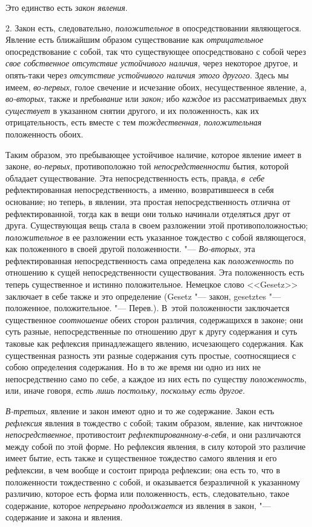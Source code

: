 Это единство есть {\em закон явления}.

2. Закон есть, следовательно, {\em положительное} в
опосредствовании являющегося. Явление есть ближайшим образом существование
как {\em отрицательное} опосредствование с собой, так
что существующее опосредствовано с собой через
{\em свое собственное отсутствие устойчивого наличия},
через некоторое другое, и опять-таки через
{\em отсутствие устойчивого наличия этого другого}.
Здесь мы имеем, {\em во-первых}, голое свечение и
исчезание обоих, несущественное явление, а,
{\em во-вторых}, также и {\em пребывание} или {\em закон;}
ибо {\em каждое} из рассматриваемых двух
{\em существует} в указанном снятии другого, и их
положенность, как их отрицательность, есть вместе с тем
{\em тождественная, положительная} положенность обоих.

Таким образом, это пребывающее устойчивое наличие, которое явление имеет в
законе, {\em во-первых}, противоположно той
{\em непосредственности} бытия, которой обладает
существование. Эта непосредственность есть, правда,
{\em в~себе} рефлектированная непосредственность, а
именно, возвратившееся в себя основание; но теперь, в явлении, эта простая
непосредственность отлична от рефлектированной, тогда как в вещи они только
начинали отделяться друг от друга. Существующая вещь стала в своем
разложении этой противоположностью; {\em положительное}
в ее разложении есть указанное тождество с собой являющегося, как
положенного в своей другой положенности. "---
{\em Во-вторых}, эта рефлектированная непосредственность сама определена как
{\em положенность} по отношению к сущей
непосредственности существования. Эта положенность есть теперь существенное
и истинно положительное. Немецкое слово <<Gesetz>> заключает в себе также и
это определение (Gesetz "--- закон, gesetztes "--- положенное,
положительное. "--- Перев.). В~этой положенности заключается существенное
{\em соотношение} обеих сторон различия, содержащихся в
законе; они суть разные, непосредственные по отношению друг к другу
содержания и суть таковые как рефлексия принадлежащего явлению, исчезающего
содержания. Как существенная разность эти разные содержания суть простые,
соотносящиеся с собою определения содержания. Но в то же время ни одно из
них не непосредственно само по себе, а каждое из них есть по существу
{\em положенность}, или, иначе говоря,
{\em есть лишь постольку, поскольку есть другое}.

{\em В-третьих}, явление и закон имеют одно и то же
содержание. Закон есть {\em рефлексия} явления в
тождество с собой; таким образом, явление, как ничтожное
{\em непосредственное}, противостоит
{\em рефлектированному-в-себя}, и они различаются между
собой по этой форме. Но рефлексия явления, в силу которой это различие
имеет бытие, есть также и существенное тождество самого явления и его
рефлексии, в чем вообще и состоит природа рефлексии; она есть то, что в
положенности тождественно с собой, и оказывается безразличной к указанному
различию, которое есть форма или положенность, есть, следовательно, такое
содержание, которое {\em непрерывно продолжается} из
явления в закон, "--- содержание и закона и явления.

